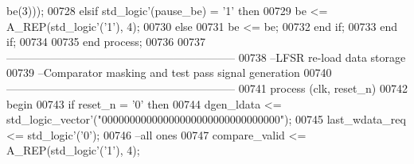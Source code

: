 \begin{DoxyCode}
{      be}\textcolor{vhdlchar}{(}\textcolor{vhdllogic}{}\textcolor{vhdllogic}{3}\textcolor{vhdlchar}{)}\textcolor{vhdlchar}{)}\textcolor{vhdlchar}{)};
00728       \textcolor{keywordflow}{elsif} \textcolor{comment}{std\_logic}\textcolor{vhdlchar}{'}\textcolor{vhdlchar}{(}\textcolor{vhdlchar}{pause_be}\textcolor{vhdlchar}{)} \textcolor{vhdlchar}{=} \textcolor{vhdlchar}{'}\textcolor{vhdllogic}{}\textcolor{vhdllogic}{1}\textcolor{vhdlchar}{'} \textcolor{keywordflow}{then} 
00729         \textcolor{vhdlchar}{be} \textcolor{vhdlchar}{<=} \textcolor{vhdlchar}{A\_REP}\textcolor{vhdlchar}{(}\textcolor{comment}{std\_logic}\textcolor{vhdlchar}{'}\textcolor{vhdlchar}{(}\textcolor{vhdlchar}{'}\textcolor{vhdllogic}{}\textcolor{vhdllogic}{1}\textcolor{vhdlchar}{'}\textcolor{vhdlchar}{)}\textcolor{vhdlchar}{,} \textcolor{vhdllogic}{}\textcolor{vhdllogic}{4}\textcolor{vhdlchar}{)};
00730       \textcolor{keywordflow}{else}
00731         \textcolor{vhdlchar}{be} \textcolor{vhdlchar}{<=} \textcolor{vhdlchar}{be};
00732       \textcolor{keywordflow}{end} \textcolor{keywordflow}{if};
00733     \textcolor{keywordflow}{end} \textcolor{keywordflow}{if};
00734 
00735   \textcolor{keywordflow}{end} \textcolor{keywordflow}{process};
00736 
00737 \textcolor{keyword}{  --------------------------------------------------------------}
00738 \textcolor{keyword}{  --LFSR re-load data storage}
00739 \textcolor{keyword}{  --Comparator masking and test pass signal generation}
00740 \textcolor{keyword}{  --------------------------------------------------------------}
00741   \textcolor{keywordflow}{process} (clk, reset_n)
00742 \textcolor{vhdlkeyword}{  begin}
00743     \textcolor{keywordflow}{if} \textcolor{vhdlchar}{reset_n} \textcolor{vhdlchar}{=} \textcolor{vhdlchar}{'}\textcolor{vhdllogic}{}\textcolor{vhdllogic}{0}\textcolor{vhdlchar}{'} \textcolor{keywordflow}{then}
00744       \textcolor{vhdlchar}{dgen_ldata} \textcolor{vhdlchar}{<=} \textcolor{comment}{std\_logic\_vector}\textcolor{vhdlchar}{'}\textcolor{vhdlchar}{(}\textcolor{vhdllogic}{"00000000000000000000000000000000"}\textcolor{vhdlchar}{)};
00745       \textcolor{vhdlchar}{last_wdata_req} \textcolor{vhdlchar}{<=} \textcolor{comment}{std\_logic}\textcolor{vhdlchar}{'}\textcolor{vhdlchar}{(}\textcolor{vhdlchar}{'}\textcolor{vhdllogic}{}\textcolor{vhdllogic}{0}\textcolor{vhdlchar}{'}\textcolor{vhdlchar}{)};
00746 \textcolor{keyword}{      --all ones}
00747       \textcolor{vhdlchar}{compare_valid} \textcolor{vhdlchar}{<=} \textcolor{vhdlchar}{A\_REP}\textcolor{vhdlchar}{(}\textcolor{comment}{std\_logic}\textcolor{vhdlchar}{'}\textcolor{vhdlchar}{(}\textcolor{vhdlchar}{'}\textcolor{vhdllogic}{}\textcolor{vhdllogic}{1}\textcolor{vhdlchar}{'}\textcolor{vhdlchar}{)}\textcolor{vhdlchar}{,} \textcolor{vhdllogic}{}\textcolor{vhdllogic}{4}\textcolor{vhdlchar}{)};

\end{DoxyCode}
